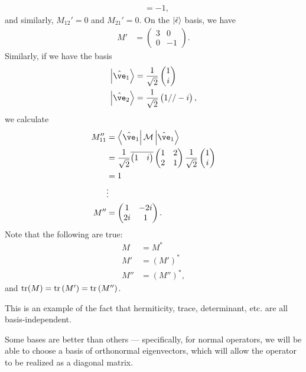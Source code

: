\documentclass[10pt]{mypackage}
\begin{document}
\begin{example}
\begin{align*}
            &= -1,
  \end{align*}
  and similarly, $M_{12}' = 0$ and $M_{21}' = 0$. On the $\ket{\hat{\epsilon}}$ basis, we have
  \begin{align*}
    M' &= \begin{pmatrix}3 & 0 \\ 0 & -1\end{pmatrix}.
  \end{align*}
  Similarly, if we have the basis
  \begin{align*}
    \ket{\hat{\ve}_1} &= \frac{1}{\sqrt{2}}\begin{pmatrix}1\\i\end{pmatrix}\\
    \ket{\hat{\ve}_2} &= \frac{1}{\sqrt{2}} \begin{pmatrix}1//-i\end{pmatrix},
  \end{align*}
  we calculate
  \begin{align*}
    M_{11}'' &= \bra{\hat{\ve}_1}\mathcal{M}\ket{\hat{\ve}_1}\\
             &= \frac{1}{\sqrt{2}} \overline{ \begin{pmatrix}1 & i\end{pmatrix} } \begin{pmatrix}1&2\\2&1\end{pmatrix} \frac{1}{\sqrt{2}} \begin{pmatrix}1\\i\end{pmatrix}\\
             &= 1\\
             &\vdots\\
    M'' &= \begin{pmatrix}1 & -2i\\2i & 1\end{pmatrix}.
  \end{align*}
  Note that the following are true:
  \begin{align*}
    M &= M^{\ast}\\
    M' &= \left(M'\right)^{\ast}\\
    M'' &= \left(M''\right)^{\ast},
  \end{align*}
  and $\tr(M) = \tr\left(M'\right) = \tr\left(M''\right)$.\newline

  This is an example of the fact that hermiticity, trace, determinant, etc. are all basis-independent.
\end{example}
Some bases are better than others --- specifically, for normal operators, we will be able to choose a basis of orthonormal eigenvectors, which will allow the operator to be realized as a diagonal matrix.
\end{document}
